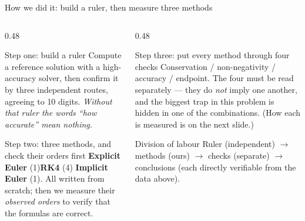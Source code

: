 \documentclass[aspectratio=169,10pt]{beamer}
\begin{document}
\begin{frame}{How we did it: build a ruler, then measure three methods}
  \begin{columns}[T]
    \begin{column}{0.48\textwidth}
      \begin{block}{Step one: build a ruler}
        \footnotesize
        Compute a \alert{reference solution} with a high-accuracy solver, then
        confirm it by three independent routes, agreeing to \alert{10 digits}.
        \emph{Without that ruler the words ``how accurate'' mean nothing.}
      \end{block}
      \begin{block}{Step two: three methods, and check their orders first}
        \footnotesize
        \textbf{Explicit Euler} (1)\quad \textbf{RK4} (4)\quad
        \textbf{Implicit Euler} (1).  All written from scratch; then we measure
        their \emph{observed orders} to verify that the formulas are correct.
      \end{block}
    \end{column}
    \begin{column}{0.48\textwidth}
      \begin{block}{Step three: put every method through four checks}
        \footnotesize
        Conservation / non-negativity / accuracy / endpoint.
        The four must be read \alert{separately} --- they do \emph{not} imply
        one another, and the biggest trap in this problem is hidden in one of
        the combinations.  (How each is measured is on the next slide.)
      \end{block}
      \begin{exampleblock}{Division of labour}
        \footnotesize
        Ruler (independent) $\to$ methods (ours) $\to$ checks (separate) $\to$
        conclusions (each directly verifiable from the data above).
      \end{exampleblock}
    \end{column}
  \end{columns}
\end{frame}
\end{document}
